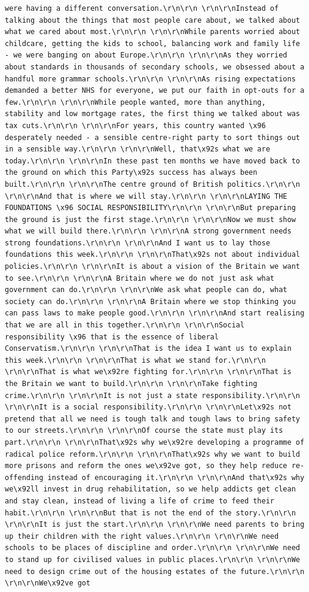 \documentclass[
  letterpaper,
  DIV=11,
  numbers=noendperiod]{scrreprt}
\begin{document}
\begin{verbatim}
were having a different conversation.\r\n\r\n \r\n\r\nInstead of talking about the things that most people care about, we talked about what we cared about most.\r\n\r\n \r\n\r\nWhile parents worried about childcare, getting the kids to school, balancing work and family life - we were banging on about Europe.\r\n\r\n \r\n\r\nAs they worried about standards in thousands of secondary schools, we obsessed about a handful more grammar schools.\r\n\r\n \r\n\r\nAs rising expectations demanded a better NHS for everyone, we put our faith in opt-outs for a few.\r\n\r\n \r\n\r\nWhile people wanted, more than anything, stability and low mortgage rates, the first thing we talked about was tax cuts.\r\n\r\n \r\n\r\nFor years, this country wanted \x96 desperately needed - a sensible centre-right party to sort things out in a sensible way.\r\n\r\n \r\n\r\nWell, that\x92s what we are today.\r\n\r\n \r\n\r\nIn these past ten months we have moved back to the ground on which this Party\x92s success has always been built.\r\n\r\n \r\n\r\nThe centre ground of British politics.\r\n\r\n \r\n\r\nAnd that is where we will stay.\r\n\r\n \r\n\r\nLAYING THE FOUNDATIONS \x96 SOCIAL RESPONSIBILITY\r\n\r\n \r\n\r\nBut preparing the ground is just the first stage.\r\n\r\n \r\n\r\nNow we must show what we will build there.\r\n\r\n \r\n\r\nA strong government needs strong foundations.\r\n\r\n \r\n\r\nAnd I want us to lay those foundations this week.\r\n\r\n \r\n\r\nThat\x92s not about individual policies.\r\n\r\n \r\n\r\nIt is about a vision of the Britain we want to see.\r\n\r\n \r\n\r\nA Britain where we do not just ask what government can do.\r\n\r\n \r\n\r\nWe ask what people can do, what society can do.\r\n\r\n \r\n\r\nA Britain where we stop thinking you can pass laws to make people good.\r\n\r\n \r\n\r\nAnd start realising that we are all in this together.\r\n\r\n \r\n\r\nSocial responsibility \x96 that is the essence of liberal Conservatism.\r\n\r\n \r\n\r\nThat is the idea I want us to explain this week.\r\n\r\n \r\n\r\nThat is what we stand for.\r\n\r\n \r\n\r\nThat is what we\x92re fighting for.\r\n\r\n \r\n\r\nThat is the Britain we want to build.\r\n\r\n \r\n\r\nTake fighting crime.\r\n\r\n \r\n\r\nIt is not just a state responsibility.\r\n\r\n \r\n\r\nIt is a social responsibility.\r\n\r\n \r\n\r\nLet\x92s not pretend that all we need is tough talk and tough laws to bring safety to our streets.\r\n\r\n \r\n\r\nOf course the state must play its part.\r\n\r\n \r\n\r\nThat\x92s why we\x92re developing a programme of radical police reform.\r\n\r\n \r\n\r\nThat\x92s why we want to build more prisons and reform the ones we\x92ve got, so they help reduce re-offending instead of encouraging it.\r\n\r\n \r\n\r\nAnd that\x92s why we\x92ll invest in drug rehabilitation, so we help addicts get clean and stay clean, instead of living a life of crime to feed their habit.\r\n\r\n \r\n\r\nBut that is not the end of the story.\r\n\r\n \r\n\r\nIt is just the start.\r\n\r\n \r\n\r\nWe need parents to bring up their children with the right values.\r\n\r\n \r\n\r\nWe need schools to be places of discipline and order.\r\n\r\n \r\n\r\nWe need to stand up for civilised values in public places.\r\n\r\n \r\n\r\nWe need to design crime out of the housing estates of the future.\r\n\r\n \r\n\r\nWe\x92ve got 
\end{verbatim}
\end{document}
